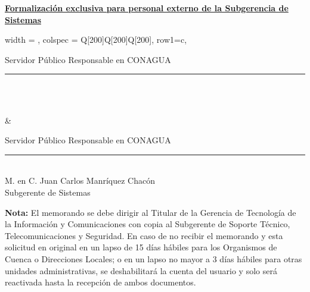 \documentclass[letterpaper,11pt]{article}
\begin{document}
\ul{\textbf {Formalización exclusiva para personal externo de la Subgerencia de Sistemas}}
\begin{longtblr}[
	label = none,
	entry = none,
	]{
			width = \linewidth,
			colspec = {Q[200]Q[200]Q[200]},
                                row{1}={c},
		}                                                                                            
		{\footnotesize Servidor Público Responsable en CONAGUA\\[1cm] \rule{5cm}{0.5mm}\\ \footnotesize \NOMBREUSUARIO\\ \footnotesize \PUESTOUSUARIO} & 
                   {\footnotesize Servidor Público Responsable en CONAGUA\\[1cm] \rule{5cm}{0.5mm}\\ \footnotesize M. en C. Juan Carlos Manríquez Chacón\\Subgerente de Sistemas}
	\end{longtblr}

{\tiny {\textbf{ Nota:}} El memorando se debe dirigir al Titular de la Gerencia de Tecnología de la Información y Comunicaciones con copia al Subgerente de Soporte Técnico, Telecomunicaciones y Seguridad. En caso de no recibir el memorando y esta solicitud en original en un lapso de 15 días hábiles para los Organismos de Cuenca o Direcciones Locales; o en un lapso no mayor a 3 días hábiles para otras unidades administrativas, se deshabilitará la cuenta del usuario y solo será reactivada hasta la recepción de ambos documentos.}
\end{document}
